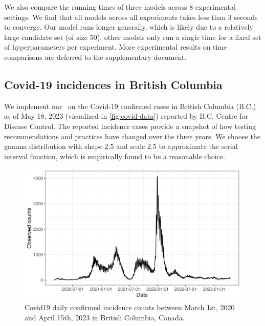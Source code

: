 We also compare the running times of three models across $8$ experimental settings. We find that all models across all experiments takes less than $3$ seconds to converge. Our model runs longer generally, which is likely due to a relatively large candidate set (of size $50$), other models only run a single time for a fixed set of hyperparameters per experiment. 
More experimental results on time comparisons are deferred to the supplementary document. 


\subsection{Covid-19 incidences in British Columbia}

We implement our \RtEstim\ on the Covid-19 confirmed cases in British Columbia (B.C.) as of May 18, 2023 (visualized in \autoref{fig:covid-data}) reported by B.C. Centre for Disease Control. The reported incidence cases provide a snapshot of how testing recommendations and practices have changed over the three years. We choose the gamma distribution with shape $2.5$ and scale $2.5$ to approximate the serial interval function, which is empirically found to be a reasonable choice. 
\begin{figure}[tb]
    \centering
    \includegraphics[width=0.99\linewidth]{fig/covid_dat.png}
    \caption{Covid19 daily confirmed incidence counts between March 1st, 2020 and April 15th, 2023 in British Columbia, Canada.} 
    \label{fig:covid-data}
\end{figure} 

